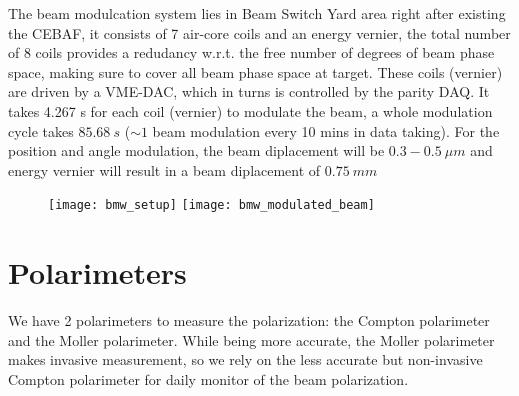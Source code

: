 The beam modulcation system lies in Beam Switch Yard area right after existing 
the CEBAF, it consists of 7 air-core coils and an energy vernier, the total 
number of 8 coils provides a redudancy w.r.t. the free number of degrees 
of beam phase space, making sure to cover all beam phase space at target.  
These coils (vernier) are driven by a VME-DAC, which in turns is controlled by the parity DAQ.
It takes 4.267 s for each coil (vernier) to modulate the beam, a whole 
modulation cycle takes $85.68 \ s$ ($\sim 1$ beam modulation every 10 mins in
data taking). For the position and angle modulation, the beam diplacement will
be $0.3-0.5\ \mu m$ and energy vernier will result in a beam diplacement of $0.75 \ mm$
\begin{figure}[h!]
    \centering
    \texttt{[image: bmw\_setup]}
    \texttt{[image: bmw\_modulated\_beam]}
\end{figure}

\section{Polarimeters}
We have 2 polarimeters to measure the polarization: the Compton polarimeter and
the Moller polarimeter. While being more accurate, the Moller polarimeter makes
invasive measurement, so we rely on the less accurate but non-invasive Compton
polarimeter for daily monitor of the beam polarization.

